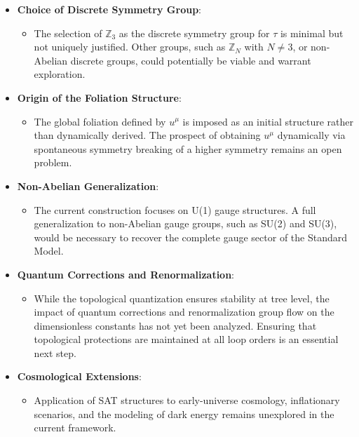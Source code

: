 \documentclass[12pt]{article}
\begin{document}
\begin{itemize}
    \item \textbf{Choice of Discrete Symmetry Group}:
    \begin{itemize}
        \item The selection of \( \mathbb{Z}_3 \) as the discrete symmetry group for \( \tau \) is minimal but not uniquely justified. Other groups, such as \( \mathbb{Z}_N \) with \( N \neq 3 \), or non-Abelian discrete groups, could potentially be viable and warrant exploration.
    \end{itemize}
    \item \textbf{Origin of the Foliation Structure}:
    \begin{itemize}
        \item The global foliation defined by \( u^\mu \) is imposed as an initial structure rather than dynamically derived. The prospect of obtaining \( u^\mu \) dynamically via spontaneous symmetry breaking of a higher symmetry remains an open problem.
    \end{itemize}
    \item \textbf{Non-Abelian Generalization}:
    \begin{itemize}
        \item The current construction focuses on U(1) gauge structures. A full generalization to non-Abelian gauge groups, such as SU(2) and SU(3), would be necessary to recover the complete gauge sector of the Standard Model.
    \end{itemize}
    \item \textbf{Quantum Corrections and Renormalization}:
    \begin{itemize}
        \item While the topological quantization ensures stability at tree level, the impact of quantum corrections and renormalization group flow on the dimensionless constants has not yet been analyzed. Ensuring that topological protections are maintained at all loop orders is an essential next step.
    \end{itemize}
    \item \textbf{Cosmological Extensions}:
    \begin{itemize}
        \item Application of SAT structures to early-universe cosmology, inflationary scenarios, and the modeling of dark energy remains unexplored in the current framework.
    \end{itemize}
\end{itemize}
\end{document}
